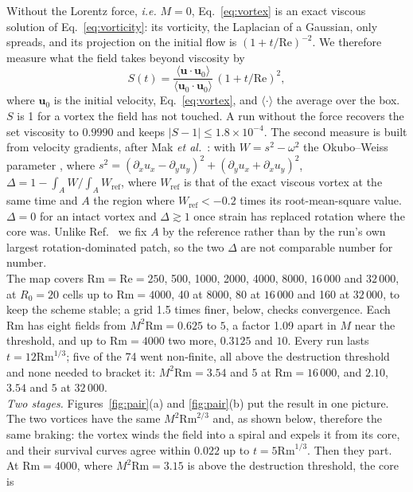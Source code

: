 \documentclass[aps,prl,twocolumn,reprint,amsmath,amssymb,superscriptaddress,floatfix]{revtex4-2}
\newcommand{\Rm}{\mathrm{Rm}}
\newcommand{\Rey}{\mathrm{Re}}
\begin{document}
Without the Lorentz force, \textit{i.e.} $M=0$, Eq.~\eqref{eq:vortex} is an exact viscous
solution of Eq.~\eqref{eq:vorticity}: its
vorticity, the Laplacian of a Gaussian, only spreads, and its projection on the
initial flow is $(1+t/\Rey)^{-2}$. We therefore measure what the field takes beyond
viscosity by
\begin{equation}
S(t)=\frac{\langle\bm u\cdot\bm u_0\rangle}{\langle\bm u_0\cdot\bm u_0\rangle}\,(1+t/\Rey)^{2},
\end{equation}
where $\bm u_0$ is the initial velocity, Eq.~\eqref{eq:vortex}, and
$\langle\cdot\rangle$ the average over the box. $S$ is 1 for a vortex the field
has not touched. A run without the force
recovers the set viscosity to $0.9990$ and keeps $|S-1|\le1.8\times10^{-4}$. The
second measure is built from velocity gradients, after Mak \textit{et al.}~\cite{mak2017}: with
$W=s^2-\omega^2$ the Okubo--Weiss parameter \cite{okubo1970,weiss1991}, where
$s^2=(\partial_xu_x-\partial_yu_y)^2+(\partial_yu_x+\partial_xu_y)^2$,
$\Delta=1-\int_A W\big/\int_A W_\mathrm{ref}$, where $W_\mathrm{ref}$ is that of the
exact viscous vortex at the same time and $A$ the region where
$W_\mathrm{ref}<-0.2$ times its root-mean-square value. $\Delta=0$ for an intact
vortex and $\Delta\gtrsim1$ once strain has replaced rotation where the core was.
Unlike Ref.~\cite{mak2017} we fix $A$ by the reference rather than by the run's own
largest rotation-dominated patch, so the two $\Delta$ are not comparable number for
number.\\
\indent The map covers $\Rm=\Rey=250$, 500, 1000, 2000, 4000, 8000, $16\,000$ and $32\,000$, at
$R_0=20$ cells up to $\Rm=4000$, 40 at 8000, 80 at $16\,000$ and 160 at $32\,000$, to keep the scheme stable; a grid 1.5 times
finer, below, checks convergence. Each $\Rm$ has eight fields from $M^2\Rm=0.625$ to $5$, a factor 1.09
apart in $M$ near the threshold, and up to $\Rm=4000$ two more, $0.3125$ and
$10$. Every run lasts $t=12\Rm^{1/3}$; five of the 74 went non-finite, all above
the destruction threshold and none needed to bracket it: $M^2\Rm=3.54$ and $5$ at $\Rm=16\,000$, and $2.10$, $3.54$
and $5$ at $32\,000$.\\
\indent \textit{Two stages.} Figures~\ref{fig:pair}(a) and \ref{fig:pair}(b) put the
result in one picture. The two vortices have the same $M^2\Rm^{2/3}$ and, as shown below, therefore the same
braking: the vortex winds the field into a spiral and expels it from its core, and
their survival curves agree within $0.022$ up to $t=5\Rm^{1/3}$. Then they part.
At $\Rm=4000$, where $M^2\Rm=3.15$ is above the destruction threshold, the core is
\end{document}
